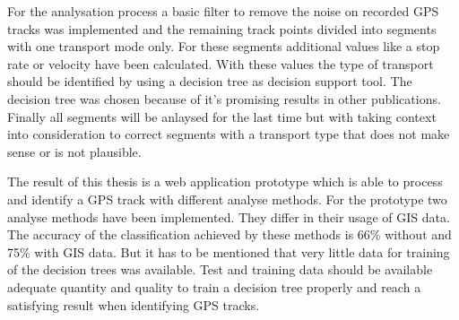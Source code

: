 For the analysation process a basic filter to remove the noise on recorded GPS tracks was implemented and the remaining track points divided into segments with one transport mode only. For these segments additional values like a stop rate or velocity have been calculated. With these values the type of transport should be identified by using a decision tree as decision support tool. The decision tree was chosen because of it's promising results in other publications. Finally all segments will be anlaysed for the last time but with taking context into consideration to correct segments with a transport type that does not make sense or is not plausible.

The result of this thesis is a web application prototype which is able to process and identify a GPS track with different analyse methods. For the prototype two analyse methods have been implemented. They differ in their usage of GIS data. The accuracy of the classification achieved by these methods is 66\% without and 75\% with GIS data. But it has to be mentioned that very little data for training of the decision trees was available. Test and training data should be available adequate quantity and quality to train a decision tree properly and reach a satisfying result when identifying GPS tracks.

\afterpage{\blankpage}
\newpage